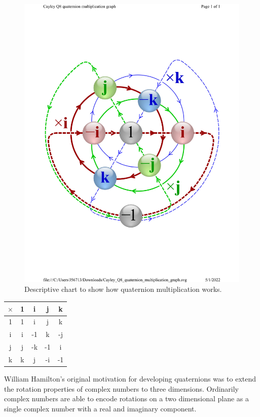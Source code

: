 \documentclass[10pt, letterpaper]{article}
\begin{document}
\begin{figure}[H]
	\centering
	\includegraphics[scale=0.6]{CayleyQ8_QuaternionMultiplicationChart.pdf}
    \caption{Descriptive chart to show how quaternion multiplication works. }
    \label{fig:QuaternionChart}
\end{figure}

\begin{center}
    \begin{tabular}{|c|cccc|}
    \hline
        $\times$ & 1 & i & j & k \\ \hline
        1 & 1 & i & j & k \\
        i & i & -1 & k & -j \\
        j & j & -k & -1 & i \\
        k & k & j & -i & -1 \\ \hline
    \end{tabular}
\end{center}

William Hamilton's original motivation for developing quaternions was to extend the rotation properties of complex numbers to three dimensions. Ordinarily complex numbers are able to encode rotations on a two dimensional plane as a single complex number with a real and imaginary component.
\end{document}
